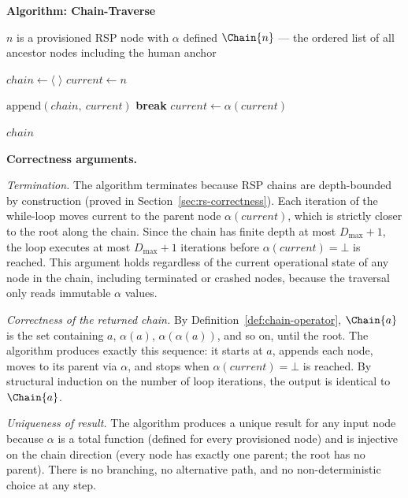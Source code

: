 \medskip
\noindent\textbf{Algorithm: Chain-Traverse}

\begin{algorithm}
\caption{Chain-Traverse($n$) — Build the delegation chain from node $n$ to the human anchor}
\label{alg:chain-traverse}
\begin{algorithmic}[1]
\REQUIRE $n$ is a provisioned RSP node with $\alpha$ defined
\ENSURE $\Chain{n}$ — the ordered list of all ancestor nodes including the human anchor

\STATE $chain \leftarrow \langle \; \rangle$ 
\STATE $current \leftarrow n$ 

    \STATE $\text{append}(chain,\ current)$ 
        \STATE \textbf{break} 
    \ENDIF
    \STATE $current \leftarrow \alpha(current)$ 
\ENDWHILE

\RETURN $chain$
\end{algorithmic}
\end{algorithm}

\medskip
\noindent\textbf{Correctness arguments.}

\textit{Termination.} The algorithm terminates because RSP chains are depth-bounded by construction (proved in Section~\ref{sec:rs-correctness}). Each iteration of the while-loop moves $\text{current}$ to the parent node $\alpha(current)$, which is strictly closer to the root along the chain. Since the chain has finite depth at most $D_{\max} + 1$, the loop executes at most $D_{\max} + 1$ iterations before $\alpha(current) = \bot$ is reached. This argument holds regardless of the current operational state of any node in the chain, including terminated or crashed nodes, because the traversal only reads immutable $\alpha$ values.

\textit{Correctness of the returned chain.} By Definition~\ref{def:chain-operator}, $\Chain{a}$ is the set containing $a$, $\alpha(a)$, $\alpha(\alpha(a))$, and so on, until the root. The algorithm produces exactly this sequence: it starts at $a$, appends each node, moves to its parent via $\alpha$, and stops when $\alpha(current) = \bot$ is reached. By structural induction on the number of loop iterations, the output is identical to $\Chain{a}$.

\textit{Uniqueness of result.} The algorithm produces a unique result for any input node because $\alpha$ is a total function (defined for every provisioned node) and is injective on the chain direction (every node has exactly one parent; the root has no parent). There is no branching, no alternative path, and no non-deterministic choice at any step.

